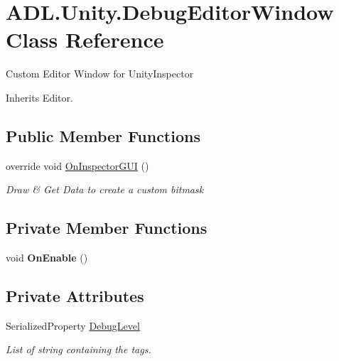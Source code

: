 \hypertarget{class_a_d_l_1_1_unity_1_1_debug_editor_window}{}\section{A\+D\+L.\+Unity.\+Debug\+Editor\+Window Class Reference}
\label{class_a_d_l_1_1_unity_1_1_debug_editor_window}


Custom Editor Window for Unity\+Inspector  




Inherits Editor.

\subsection*{Public Member Functions}
\begin{DoxyCompactItemize}
\item 
override void \mbox{\hyperlink{class_a_d_l_1_1_unity_1_1_debug_editor_window_ab25bbc6b5b7b8260e76dbf9a781fa815}{On\+Inspector\+G\+UI}} ()
\begin{DoxyCompactList}\small\item\em Draw \& Get Data to create a custom bitmask \end{DoxyCompactList}\end{DoxyCompactItemize}
\subsection*{Private Member Functions}
\begin{DoxyCompactItemize}
\item 
\mbox{\label{class_a_d_l_1_1_unity_1_1_debug_editor_window_a9f041720e003ee2f99df45e6abdf82d5}} 
void {\bfseries On\+Enable} ()
\end{DoxyCompactItemize}
\subsection*{Private Attributes}
\begin{DoxyCompactItemize}
\item 
Serialized\+Property \mbox{\hyperlink{class_a_d_l_1_1_unity_1_1_debug_editor_window_a2eee4bf996ebefb9635562de4614d81b}{Debug\+Level}}
\begin{DoxyCompactList}\small\item\em List of string containing the tags. \end{DoxyCompactList}\end{DoxyCompactItemize}


